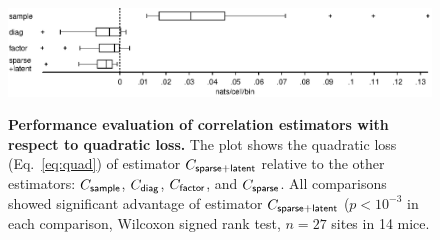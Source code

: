 \begin{figure}
\begin{fullpage}

        \begin{center}
        \includegraphics[width=\textwidth]{./figures/Supp02.eps}
        \end{center}

\begin{caption}
{\bf Performance evaluation of correlation estimators with respect to quadratic loss.} 
The plot shows the quadratic loss (Eq.~\ref{eq:quad}) of estimator $C_{\sf sparse+latent}$ relative to the other estimators: $C_{\sf sample}$, $C_{\sf diag}$, $C_{\sf factor}$, and $C_{\sf sparse}$. All comparisons showed significant advantage of estimator $C_{\sf sparse+latent}$ ($p<10^{-3}$ in each comparison, Wilcoxon signed rank test, $n=27$ sites in 14 mice.
\end{caption}\label{fig:S2}
\end{fullpage}
\end{figure}
